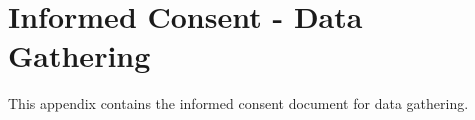 %
%
%                 

\chapter{Informed Consent - Data Gathering}
\label{sec:appendixg}

This appendix contains the informed consent document for data gathering. 



